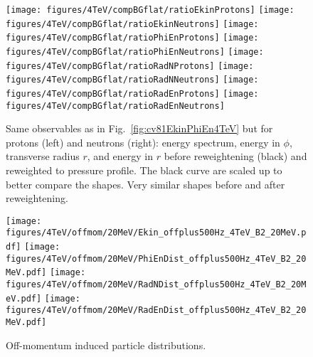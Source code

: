 \begin{figure}
\begin{center}
  \texttt{[image: figures/4TeV/compBGflat/ratioEkinProtons]}
  \texttt{[image: figures/4TeV/compBGflat/ratioEkinNeutrons]}
  \texttt{[image: figures/4TeV/compBGflat/ratioPhiEnProtons]}
  \texttt{[image: figures/4TeV/compBGflat/ratioPhiEnNeutrons]}
  \texttt{[image: figures/4TeV/compBGflat/ratioRadNProtons]}
  \texttt{[image: figures/4TeV/compBGflat/ratioRadNNeutrons]}
  \texttt{[image: figures/4TeV/compBGflat/ratioRadEnProtons]}
  \texttt{[image: figures/4TeV/compBGflat/ratioRadEnNeutrons]}
\end{center}
\vspace{-0.6cm}
 \caption{Same observables as in Fig.~\ref{fig:cv81EkinPhiEn4TeV} but for protons (left) and neutrons (right): energy spectrum, energy in $\phi$, transverse radius $r$, and energy in $r$ before reweightening (black) and reweighted to pressure profile. The black curve are scaled up to better compare the shapes. Very similar shapes before and after reweightening.
   \label{fig:cv81ProtNeut4TeV}}
\end{figure}



\begin{figure}
  \begin{center}
    \texttt{[image: figures/4TeV/offmom/20MeV/Ekin\_offplus500Hz\_4TeV\_B2\_20MeV.pdf]}
    \texttt{[image: figures/4TeV/offmom/20MeV/PhiEnDist\_offplus500Hz\_4TeV\_B2\_20MeV.pdf]}
  \texttt{[image: figures/4TeV/offmom/20MeV/RadNDist\_offplus500Hz\_4TeV\_B2\_20MeV.pdf]}
  \texttt{[image: figures/4TeV/offmom/20MeV/RadEnDist\_offplus500Hz\_4TeV\_B2\_20MeV.pdf]}

\end{center}
\vspace{-0.6cm}
 \caption{Off-momentum induced particle distributions.
  \label{offmom4TeV2}}
\end{figure}




